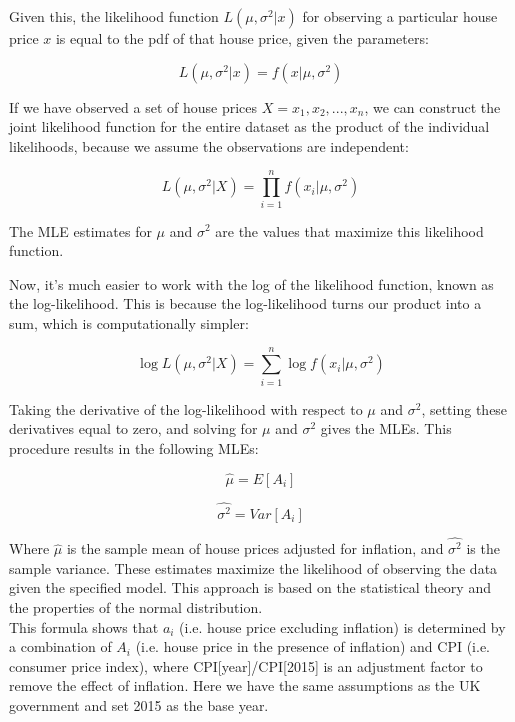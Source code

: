 \documentclass[12pt]{article}  %
\begin{document}
Given this, the likelihood function $L(\mu, \sigma^2|x)$ for observing a particular house price $x$ is equal to the pdf of that house price, given the parameters:

\begin{equation}
L(\mu, \sigma^2|x)=f(x|\mu, \sigma^2)
\end{equation}

If we have observed a set of house prices $X={x_1, x_2, ..., x_n}$, we can construct the joint likelihood function for the entire dataset as the product of the individual likelihoods, because we assume the observations are independent:

\begin{equation}
L(\mu, \sigma^2|X)=\prod_{i=1}^{n} f(x_i|\mu, \sigma^2)
\end{equation}

The MLE estimates for $\mu$ and $\sigma^2$ are the values that maximize this likelihood function.

Now, it's much easier to work with the log of the likelihood function, known as the log-likelihood. This is because the log-likelihood turns our product into a sum, which is computationally simpler:

\begin{equation}
\log L(\mu, \sigma^2|X)=\sum_{i=1}^{n} \log f(x_i|\mu, \sigma^2)
\end{equation}

Taking the derivative of the log-likelihood with respect to $\mu$ and $\sigma^2$, setting these derivatives equal to zero, and solving for $\mu$ and $\sigma^2$ gives the MLEs. This procedure results in the following MLEs:

\begin{equation}
\hat{\mu}=E[A_i]
\end{equation}

\begin{equation}
\hat{\sigma^2}=Var[A_i]
\end{equation}

Where $\hat{\mu}$ is the sample mean of house prices adjusted for inflation, and $\hat{\sigma^2}$ is the sample variance. These estimates maximize the likelihood of observing the data given the specified model. This approach is based on the statistical theory and the properties of the normal distribution.\\
This formula shows that $a_i$ (i.e. house price excluding inflation) is determined by a combination of $A_i$ (i.e. house price in the presence of inflation) and CPI (i.e. consumer price index), where CPI[year]/CPI[2015] is an adjustment factor to remove the effect of inflation. Here we have the same assumptions as the UK government and set 2015 as the base year.
\textsuperscript{\cite{guide}} \
\end{document}
